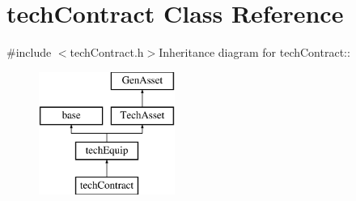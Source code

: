 \hypertarget{classtech_contract}{
\section{techContract Class Reference}
\label{classtech_contract}
}


{\ttfamily \#include $<$techContract.h$>$}Inheritance diagram for techContract::\begin{figure}[H]
\begin{center}
\leavevmode
\includegraphics[height=4cm]{classtech_contract}
\end{center}
\end{figure}

